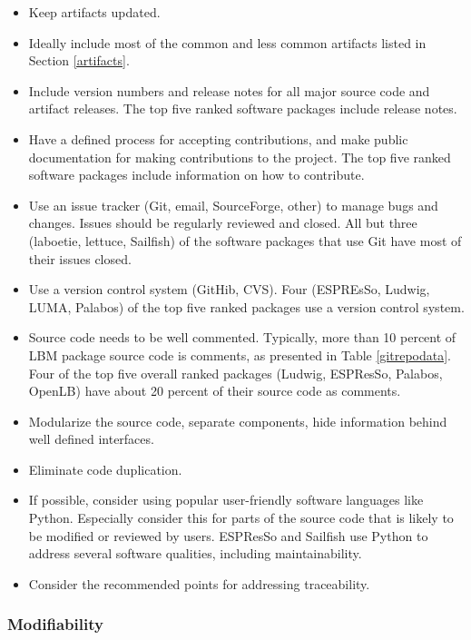 \documentclass[12pt, notitlepage]{article}
\begin{document}
\begin{itemize}
	\item Keep artifacts updated.
	\item Ideally include most of the common and less common artifacts listed in Section \ref{artifacts}.
	\item Include version numbers and release notes for all major source code and artifact releases. The top five ranked software packages include release notes.
	\item Have a defined process for accepting contributions, and make public documentation for making contributions to the project. The top five ranked software packages include information on how to contribute. 
	\item Use an issue tracker (Git, email, SourceForge, other) to manage bugs and changes. Issues should be regularly reviewed and closed. All but three (laboetie, lettuce, Sailfish) of the software packages that use Git have most of their issues closed.
	\item Use a version control system (GitHib, CVS). Four (ESPREsSo, Ludwig, LUMA, Palabos) of the top five ranked packages use a version control system.
	\item Source code needs to be well commented. Typically, more than 10 percent of LBM package source code is comments, as presented in Table \ref{gitrepodata}. Four of the top five overall ranked packages (Ludwig, ESPResSo, Palabos, OpenLB) have about 20 percent of their source code as comments.
	\item Modularize the source code, separate components, hide information behind well defined interfaces.
	\item Eliminate code duplication.
	\item If possible, consider using popular user-friendly software languages like Python. Especially consider this for parts of the source code that is likely to be modified or reviewed by users. ESPResSo and Sailfish use Python to address several software qualities, including maintainability.
	\item Consider the recommended points for addressing traceability.
\end{itemize}

\subsubsection{Modifiability}
\end{document}
